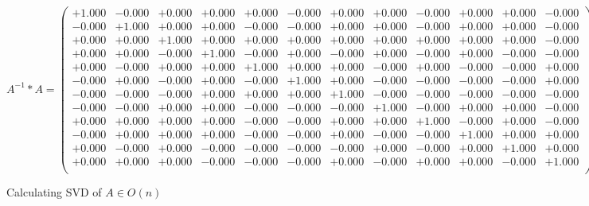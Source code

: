 \documentclass[9pt]{article}
\theoremstyle{plain}
\theoremstyle{definition}
\theoremstyle{remark}
\numberwithin{equation}{section}
\begin{document}
$A^{-1} *A = \left(
\begin{array}{
cccccccccccc}
+1.000 & -0.000 & +0.000 & +0.000 & +0.000 & -0.000 & +0.000 & +0.000 & -0.000 & +0.000 & +0.000 & -0.000 \\
-0.000 & +1.000 & +0.000 & +0.000 & -0.000 & -0.000 & +0.000 & +0.000 & -0.000 & +0.000 & +0.000 & -0.000 \\
+0.000 & +0.000 & +1.000 & +0.000 & +0.000 & +0.000 & +0.000 & +0.000 & +0.000 & +0.000 & +0.000 & -0.000 \\
+0.000 & +0.000 & -0.000 & +1.000 & -0.000 & +0.000 & -0.000 & +0.000 & -0.000 & +0.000 & -0.000 & -0.000 \\
+0.000 & -0.000 & +0.000 & +0.000 & +1.000 & +0.000 & +0.000 & -0.000 & +0.000 & -0.000 & -0.000 & +0.000 \\
-0.000 & +0.000 & -0.000 & +0.000 & -0.000 & +1.000 & +0.000 & -0.000 & -0.000 & -0.000 & -0.000 & +0.000 \\
-0.000 & -0.000 & -0.000 & +0.000 & +0.000 & +0.000 & +1.000 & -0.000 & -0.000 & -0.000 & -0.000 & -0.000 \\
-0.000 & -0.000 & +0.000 & +0.000 & -0.000 & -0.000 & -0.000 & +1.000 & -0.000 & +0.000 & +0.000 & -0.000 \\
+0.000 & +0.000 & +0.000 & +0.000 & -0.000 & -0.000 & +0.000 & +0.000 & +1.000 & -0.000 & +0.000 & -0.000 \\
-0.000 & +0.000 & +0.000 & +0.000 & -0.000 & -0.000 & +0.000 & -0.000 & -0.000 & +1.000 & +0.000 & +0.000 \\
+0.000 & -0.000 & +0.000 & -0.000 & -0.000 & -0.000 & -0.000 & +0.000 & -0.000 & +0.000 & +1.000 & +0.000 \\
+0.000 & +0.000 & +0.000 & -0.000 & -0.000 & -0.000 & +0.000 & -0.000 & +0.000 & +0.000 & -0.000 & +1.000 \\
\end{array}
\right)$ \newline 

Calculating SVD of  $A \in O(n)$
\end{document}

